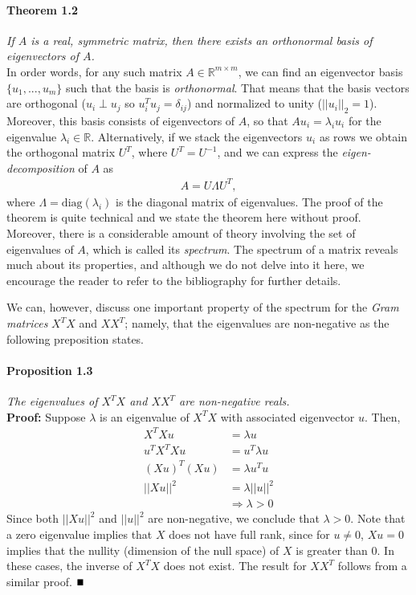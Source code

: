 \documentclass[12pt,letterpaper]{article}
\newcommand{\Rset}{\mathbb{R}}
\begin{document}
\noindent
\paragraph{\bf Theorem 1.2} \label{par:theor1.2} \textit{ If $A$ is a real, symmetric matrix, then there exists an orthonormal basis of eigenvectors of $A$.} 
\\ 
In order words, for any such matrix $A \in {\Rset}^{m\times m}$, we can find an eigenvector basis $ \{u_1 , . . . , u_m\}$ such that the basis is \emph{orthonormal}. That means that the basis vectors are orthogonal ($u_i \perp u_j$ so $u_i^T u_j  = \delta_{ij}$) and normalized to unity ($|| u_i ||_2 = 1$). Moreover, this basis consists of eigenvectors of $A$, so that $Au_i = \lambda_i u_i$ for the eigenvalue $\lambda_i \in \Rset$.
%
Alternatively, if we stack the eigenvectors $u_i$ as rows we obtain the orthogonal matrix   $U^T$, where  $U^T = U^{-1}$, and we can express the \emph{eigen-decomposition} of $A$ as 
\begin{align}
\label{eq:decomposition}
A = U\Lambda U^T,
\end{align}
where $\Lambda = \text{diag}(\lambda_i)$ is the diagonal matrix of eigenvalues.
%
The proof of the theorem is quite technical and we state the theorem here without proof. Moreover, there is a considerable amount of theory involving the set of eigenvalues of $A$, which is called its \emph{spectrum}. The spectrum of a matrix reveals much about its properties, and although we do not delve into it here, we encourage the reader to refer to the bibliography for further details.

We can, however, discuss one important property of the spectrum for the \emph{Gram matrices} $X^T X$ and $XX^T$; namely, that the eigenvalues are non-negative as the following preposition states.  

\noindent
\paragraph{\bf Proposition 1.3}\label{par:prop1.3} \textit{ The eigenvalues of $X^T X$ and $XX^T$ are non-negative reals.}
\\
{\bf Proof:} Suppose $\lambda$ is an eigenvalue of $X^T X$ with associated eigenvector $u$. Then,
\begin{align}
X^T X u &= \lambda u \nonumber \\ 
u^T X^T X u &= u^T \lambda u \nonumber \\
(X u)^T(X u) &= \lambda u^T  u \nonumber \\
||Xu||^2 &= \lambda ||u||^2 \nonumber \\
&\Rightarrow  \lambda >0
\end{align}
Since both $||X u||^2 $ and $||u||^2$ are non-negative, we conclude that $\lambda > 0$. Note that a zero eigenvalue implies that $X$ does not have full rank, since for $u \neq 0$, $X u = 0$ implies that the nullity (dimension of the null space) of $X$ is greater than 0. In these cases, the inverse of $X^T X$ does not exist. The result for $XX^T$ follows from a similar proof. $\hfill \blacksquare$
\end{document}
